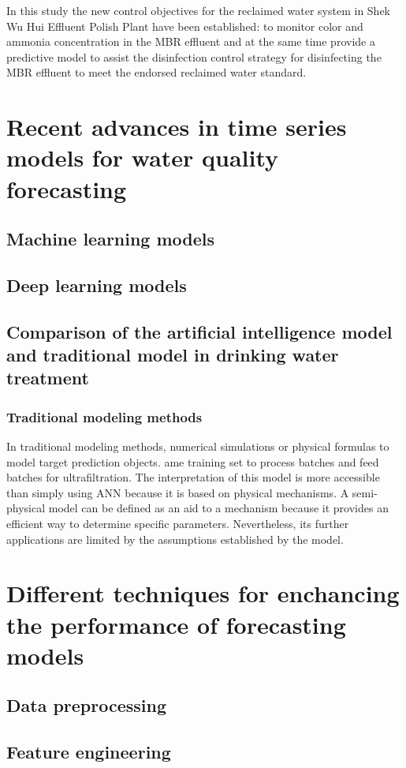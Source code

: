 In this study the new control objectives for the reclaimed water system in 
Shek Wu Hui Effluent Polish Plant have been established: to monitor color 
and ammonia concentration in the MBR effluent and at the same time provide 
a predictive model to assist the disinfection control strategy for disinfecting 
the MBR effluent to meet the endorsed reclaimed water standard.

\section{Recent advances in time series models for water quality forecasting}
\subsection{Machine learning models}

\subsection{Deep learning models}
\subsection{Comparison of the artificial intelligence model and traditional model in drinking water treatment}
\subsubsection{Traditional modeling methods}
In traditional modeling methods, numerical simulations or physical formulas to model target prediction objects. 
ame training set to process batches and feed batches for ultrafiltration. The interpretation of this model is 
more accessible than simply using ANN because it is based on physical mechanisms. A semi-physical model can 
be defined as an aid to a mechanism because it provides an efficient way to determine specific parameters. 
Nevertheless, its further applications are limited by the assumptions established by the model.
\section{Different techniques for enchancing the performance of forecasting models}
\subsection{Data preprocessing}

\subsection{Feature engineering}

